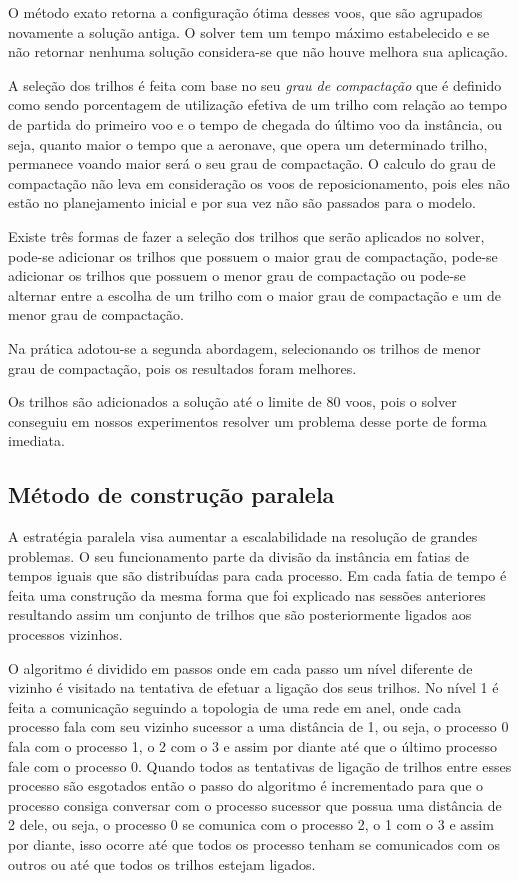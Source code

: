 O método exato retorna a configuração ótima desses voos, que
são agrupados novamente a solução antiga. O solver tem um tempo máximo
estabelecido e se não retornar nenhuma solução considera-se que não houve
melhora sua aplicação.

A seleção dos trilhos é feita com base no seu
\textit{grau de compactação} que é definido como sendo porcentagem de
utilização efetiva de um trilho com relação ao tempo de partida do primeiro voo
e o tempo de chegada do último voo da instância, ou seja, quanto maior o tempo
que a aeronave, que opera um determinado trilho, permanece voando maior será o
seu grau de compactação. O calculo do grau de compactação não leva em
consideração os voos de reposicionamento, pois eles não estão no planejamento
inicial e por sua vez não são passados para o modelo.

Existe três formas de fazer a seleção dos trilhos que serão aplicados no solver,
pode-se adicionar os trilhos que possuem o maior grau de compactação, pode-se
adicionar os trilhos que possuem o menor grau de compactação ou pode-se alternar
entre a escolha de um trilho com o maior grau de compactação e um de menor grau
de compactação.

Na prática adotou-se a segunda abordagem, selecionando os trilhos de menor grau
de compactação, pois os resultados foram melhores.
 
Os trilhos são adicionados a solução até o limite de 80 voos, pois o solver
conseguiu em nossos experimentos resolver um problema desse porte de forma
imediata. 

\subsection{Método de construção paralela}

A estratégia paralela visa aumentar a escalabilidade na resolução de grandes
problemas. O seu funcionamento parte da divisão da instância em fatias de tempos
iguais que são distribuídas para cada processo. Em cada fatia de tempo é feita
uma construção da mesma forma que foi explicado nas sessões anteriores
resultando assim um conjunto de trilhos que são posteriormente ligados aos
processos vizinhos.
 
O algoritmo é dividido em passos onde em cada passo um
nível diferente de vizinho é visitado na tentativa de efetuar a ligação dos seus
trilhos. No nível 1 é feita a comunicação seguindo a topologia de uma
rede em anel, onde cada processo fala com seu vizinho sucessor a uma distância
de 1, ou seja, o processo 0 fala com o processo 1, o 2 com o 3 e assim por
diante até que o último processo fale com o processo 0. Quando todos as tentativas de
ligação de trilhos entre esses processo são esgotados então o passo do algoritmo
é incrementado para que o processo consiga conversar com o processo sucessor que
possua uma distância de 2 dele, ou seja, o processo 0 se comunica com o processo
2, o 1 com o 3 e assim por diante, isso ocorre até que todos os processo tenham
se comunicados com os outros ou até que todos os trilhos estejam ligados.

